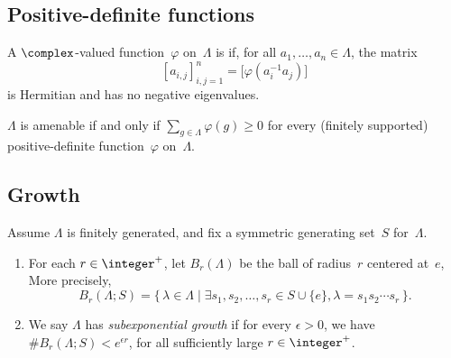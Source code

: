\subsection{Positive-definite functions}

\begin{defn}
A $\complex$-valued function~$\varphi$ on~$\Lambda$ is  if, for all $a_1,\ldots,a_n \in \Lambda$, the matrix
	$$ [a_{i,j}]_{i,j=1}^n = \bigl[ \varphi( a_i^{-1} a_j ) \bigr] $$
is Hermitian and has no negative eigenvalues.
\end{defn}


\begin{thm}
$\Lambda$ is amenable if and only if\/ $\sum_{g \in \Lambda} \varphi(g) \ge 0$ for every\/ \textup(finitely supported\/\textup) positive-definite function~$\varphi$ on~$\Lambda$.
\end{thm}




\subsection{Growth}

\begin{defn}
Assume $\Lambda$ is finitely generated, and fix a symmetric generating set~$S$ for~$\Lambda$. 
\noprelistbreak
	\begin{enumerate}
	\item For each $r \in \integer^+$, let $B_r(\Lambda)$ be the ball of radius~$r$ centered at~$e$, More precisely,
		$$ B_r(\Lambda; S) = \{\, \lambda \in \Lambda \mid \exists s_1,s_2,\ldots,s_r \in S \cup \{e\}, \lambda = s_1 s_2 \cdots s_r \,\} .$$
	\item We say $\Lambda$ has \emph{subexponential growth} if for every $\epsilon > 0$, we have $\# B_r(\Lambda; S) < e^{\epsilon r}$, for all sufficiently large $r \in \integer^+$.
	\end{enumerate}
\end{defn}

